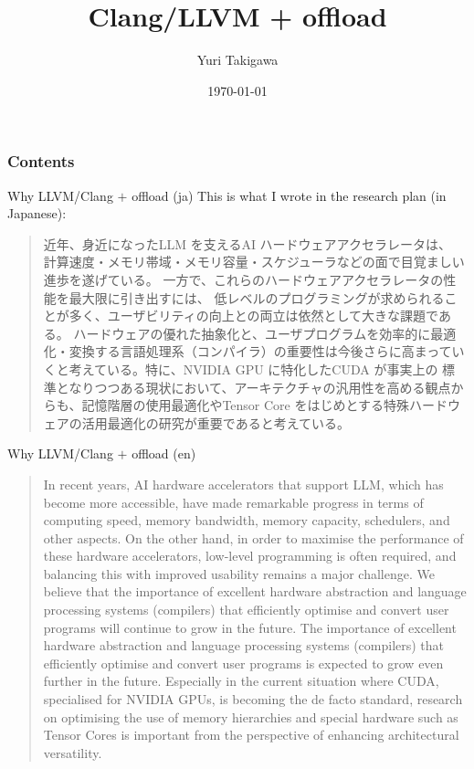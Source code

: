 \documentclass[dvipdfmx, 11pt, aspectratio=169]{beamer}   %
\title{Clang/LLVM + offload}
\author{Yuri Takigawa}
\institute{The university of Tokyo, EEIC, Taura Lab}
\date{\today}
\begin{document}
\begin{frame}
  \titlepage       
\end{frame}
\begin{frame}
  \frametitle{Contents}
  \tableofcontents
\end{frame}
\begin{frame}{Why LLVM/Clang $+$ offload (ja)}
This is what I wrote in the research plan (in Japanese):
\begin{quote}
近年、身近になったLLM を支えるAI ハードウェアアクセラレータは、
計算速度・メモリ帯域・メモリ容量・スケジューラなどの面で目覚ましい進歩を遂げている。
一方で、これらのハードウェアアクセラレータの性能を最大限に引き出すには、
低レベルのプログラミングが求められることが多く、ユーザビリティの向上との両立は依然として大きな課題である。
ハードウェアの優れた抽象化と、ユーザプログラムを効率的に最適化・変換する言語処理系（コンパイラ）の重要性は今後さらに高まっていくと考えている。特に、NVIDIA GPU に特化したCUDA が事実上の
標準となりつつある現状において、アーキテクチャの汎用性を高める観点からも、記憶階層の使用最適化やTensor Core をはじめとする特殊ハードウェアの活用最適化の研究が重要であると考えている。
\end{quote}
\end{frame}
\begin{frame}{Why LLVM/Clang $+$ offload (en)}
\begin{quote}
{\small
In recent years, AI hardware accelerators that support LLM, which has become more accessible, have made remarkable progress in terms of computing speed, memory bandwidth, memory capacity, schedulers, and other aspects.
On the other hand, in order to maximise the performance of these hardware accelerators,
low-level programming is often required, and balancing this with improved usability remains a major challenge.
We believe that the importance of excellent hardware abstraction and language processing systems (compilers) that efficiently optimise and convert user programs will continue to grow in the future.
The importance of excellent hardware abstraction and language processing systems (compilers) that efficiently optimise and convert user programs is expected to grow even further in the future. Especially in the current situation where CUDA, specialised for NVIDIA GPUs, is becoming the de facto standard,
research on optimising the use of memory hierarchies and special hardware such as Tensor Cores is important from the perspective of enhancing architectural versatility.
}
\end{quote}
\end{frame}
\end{document}
